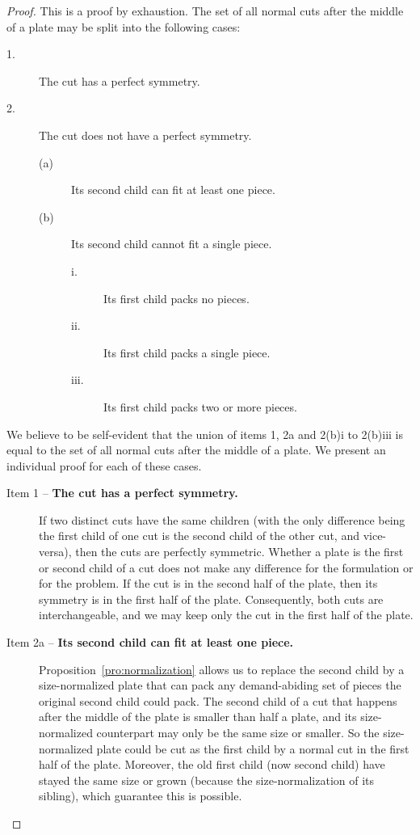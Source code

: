 \documentclass[9pt]{entcs}
\begin{document}
\begin{proof}
This is a proof by exhaustion. The set of all normal cuts after the middle of a plate may be split into the following cases:
\begin{description}
  \item[1.] The cut has a perfect symmetry. \label{case:perfectly_symmetric}
  \item[2.] The cut does not have a perfect symmetry.
  \begin{description}
    \item[(a)] Its second child can fit at least one piece. \label{case:usable_second_child}
    \item[(b)] Its second child cannot fit a single piece.
    \begin{description}
      \item[i.] Its first child packs no pieces. \label{case:no_pieces}
      \item[ii.] Its first child packs a single piece. \label{case:one_piece} %
      \item[iii.] Its first child packs two or more pieces. \label{case:many_pieces}
    \end{description}
  \end{description}
\end{description}

We believe to be self-evident that the union of items 1, 2a and 2(b)i to 2(b)iii is equal to the set of all normal cuts after the middle of a plate. We present an individual proof for each of these cases.

\begin{description}
\item[Item 1 -- \textbf{The cut has a perfect symmetry.}]
If two distinct cuts have the same children (with the only difference being the first child of one cut is the second child of the other cut, and vice-versa), then the cuts are perfectly symmetric.
Whether a plate is the first or second child of a cut does not make any difference for the formulation or for the problem.
If the cut is in the second half of the plate, then its symmetry is in the first half of the plate.
Consequently, both cuts are interchangeable, and we may keep only the cut in the first half of the plate.
\item[Item 2a -- \textbf{Its second child can fit at least one piece.}]
Proposition~\autoref{pro:normalization} allows us to replace the second child by a size-normalized plate that can pack any demand-abiding set of pieces the original second child could pack.
The second child of a cut that happens after the middle of the plate is smaller than half a plate, and its size-normalized counterpart may only be the same size or smaller.
So the size-normalized plate could be cut as the first child by a normal cut in the first half of the plate.
Moreover, the old first child (now second child) have stayed the same size or grown (because the size-normalization of its sibling), which guarantee this is possible.


\end{description}
\end{proof}
\end{document}
